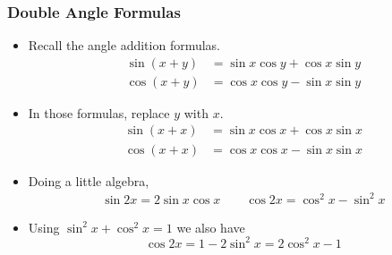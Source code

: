 \documentclass[serif,ignorenonframetext]{beamer}
\begin{document}
\begin{frame}
  \frametitle{Double Angle Formulas}
  \begin{itemize}[<+->]
  \item Recall the angle addition formulas.
    \begin{align*}
      \sin(x+y) &= \sin x \cos y + \cos x \sin y \\
      \cos(x+y) &= \cos x \cos y - \sin x \sin y
    \end{align*}
  \item In those formulas, replace $y$ with $x$.
    \begin{align*}
      \sin(x+x) &= \sin x \cos x + \cos x \sin x \\
      \cos(x+x) &= \cos x \cos x - \sin x \sin x
    \end{align*}
  \item Doing a little algebra,
    \begin{align*}
      \sin 2x = 2\sin x \cos x \qquad
      \cos 2x = \cos^2 x - \sin^2 x
    \end{align*}
  \item Using $\sin^2 x + \cos^2x =1$ we also have
    \begin{equation*}
      \cos 2x = 1-2\sin^2x = 2\cos^2 x -1
    \end{equation*}
  \end{itemize}
\end{frame}
\end{document}
